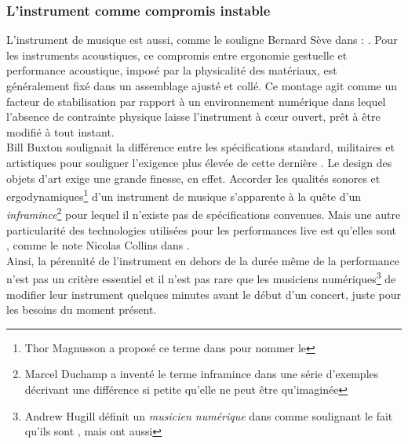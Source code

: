 	
\subsubsection{L'instrument comme compromis instable}

L'instrument de musique est aussi, comme le souligne Bernard Sève dans \cite{seve_instrument_2013} : . Pour les instruments acoustiques, ce compromis entre ergonomie gestuelle et performance acoustique, imposé par la physicalité des matériaux, est généralement fixé dans un assemblage ajusté et collé. Ce montage agit comme un facteur de stabilisation par rapport à un environnement numérique dans lequel l'absence de contrainte physique laisse l'instrument à cœur ouvert, prêt à être modifié à tout instant.\\
\indent Bill Buxton soulignait la différence entre les spécifications standard, militaires et artistiques pour souligner l'exigence plus élevée de cette dernière \cite{buxton_artists_1997}. Le design des objets d'art exige une grande finesse, en effet. Accorder les qualités sonores et ergodynamiques\footnote{Thor Magnusson a proposé ce terme dans \cite{magnusson_ergodynamics_2019} pour nommer le } d'un instrument de musique s'apparente à la quête d'un \textit{inframince}\footnote{Marcel Duchamp \cite{duchamp_notes_2008} a inventé le terme inframince dans une série d'exemples décrivant une différence si petite qu'elle ne peut être qu'imaginée} pour lequel il n'existe pas de spécifications convenues. Mais une autre particularité des technologies utilisées pour les performances live est qu'elles sont , comme le note Nicolas Collins dans \cite{collins_semiconducting_2013}.\\
\indent Ainsi, la pérennité de l'instrument en dehors de la durée même de la performance n'est pas un critère essentiel et il n'est pas rare que les musiciens numériques\footnote{Andrew Hugill définit un \textit{musicien numérique} dans \cite{hugill_digital_2019} comme  soulignant le fait qu'ils sont , mais ont aussi } de modifier leur instrument quelques minutes avant le début d'un concert, juste pour les besoins du moment présent.

